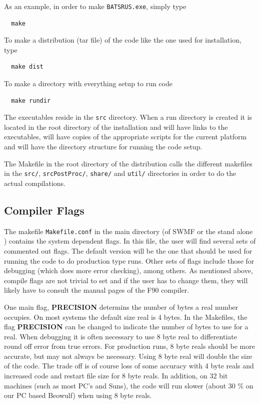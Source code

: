 As an example, in order to make {\tt BATSRUS.exe}, simply type 
\begin{verbatim}
  make
\end{verbatim}
To make a distribution (tar file) of the code like the one used for installation,  type
\begin{verbatim}
  make dist
\end{verbatim}
To make a directory with everything setup to run code
\begin{verbatim}
  make rundir
\end{verbatim}
The executables reside in the {\tt src} directory.  When a run
directory is created it is located in the root directory of the
installation and will have links to the executables, will have copies of
the appropriate scripts for the current platform and will have the
directory structure for running the code setup.

The Makefile in the root directory of the distribution calls the
different makefiles in the  {\tt src/}, {\tt srcPostProc/}, {\tt share/}
and {\tt util/} directories in order to do the actual compilations. 

\subsection{Compiler Flags \label{section:compiler_flags}} 

The makefile {\tt Makefile.conf} in the main directory (of SWMF or
the stand alone \BATSRUS) contains the system dependent flags.
In this file, the user will find several sets of commented out flags.
The default version will be the one that should be used for running 
the code to do production type runs.  Other sets of flags include
those for debugging (which does more error checking), among others.
As mentioned above, compile flags are not trivial to set and if the user 
has to change them, they will
likely have to consult the manual pages of the F90 compiler.

One main flag, {\bf PRECISION}
determins the number of bytes a real number occupies.  
On most systems the default size real is 4 bytes.  
In the Makefiles, the flag {\bf PRECISION} can be changed to
indicate the number of bytes to use for a real.
When debugging it is often necessary to use 8 byte real to differentiate
round off error from true errors.  For production runs, 8 byte reals should
be more accurate, but may not always be necessary. 
Using 8 byte real will double the size of the code.
The trade off is of course loss of some accuracy with 4 byte reals
and increased code and restart file size for 8 byte reals.
In addition, on 32 bit machines (such as most PC's and Suns), the code
will run slower (about 30 \% on our PC based Beowulf) when using 8 byte reals.

